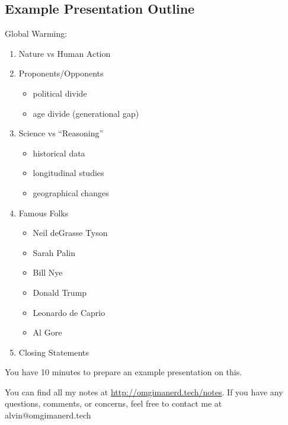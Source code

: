 \documentclass[letterpaper, 12pt]{article}
\begin{document}
\subsection*{Example Presentation Outline}
Global Warming:
\begin{enumerate}
  \item Nature vs Human Action
  \item Proponents/Opponents
    \begin{itemize}
      \item political divide
      \item age divide (generational gap)
    \end{itemize}
  \item Science vs ``Reasoning''
    \begin{itemize}
      \item historical data
      \item longitudinal studies
      \item geographical changes
    \end{itemize}
  \item Famous Folks
    \begin{itemize}
      \item Neil deGrasse Tyson
      \item Sarah Palin
      \item Bill Nye
      \item Donald Trump
      \item Leonardo de Caprio
      \item Al Gore
    \end{itemize}
  \item Closing Statements
\end{enumerate}
You have 10 minutes to prepare an example presentation on this.

\begin{center}
  You can find all my notes at \url{http://omgimanerd.tech/notes}. If you have
  any questions, comments, or concerns, feel free to contact me at
  alvin@omgimanerd.tech
\end{center}
\end{document}
